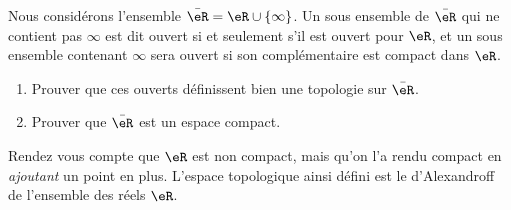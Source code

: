 
\begin{exercice}\label{exo0088}

Nous considérons l'ensemble $\bar\eR=\eR\cup\{\infty\}$. Un sous ensemble de $\bar\eR$ qui
  ne contient pas $\infty$ est dit ouvert si et seulement s'il est ouvert pour $\eR$, et un sous ensemble contenant $\infty$ sera ouvert si son complémentaire est compact dans $\eR$.

\begin{enumerate}

\item
Prouver que ces ouverts définissent bien une topologie sur $\bar\eR$.

\item
Prouver que $\bar\eR$ est un espace compact.

\end{enumerate}
Rendez vous compte que $\eR$ est non compact, mais qu'on l'a rendu compact en \emph{ajoutant} un point en plus. L'espace topologique ainsi défini est le  d'Alexandroff de l'ensemble des réels $\eR$.

\end{exercice}
